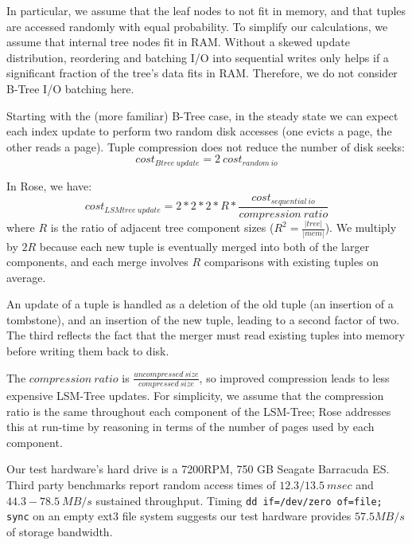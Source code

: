 \documentclass{vldb}
\newcommand{\rows}{Rose\xspace}
\begin{document}
In particular, we assume that the leaf nodes to not fit in memory, and
that tuples are accessed randomly with equal probability.  To simplify
our calculations, we assume that internal tree nodes fit in RAM.
Without a skewed update distribution, reordering and batching I/O into
sequential writes only helps if a significant fraction of the tree's
data fits in RAM.  Therefore, we do not consider B-Tree I/O batching here.

Starting with the (more familiar) B-Tree case, in the steady state we
can expect each index update to perform two random disk accesses (one
evicts a page, the other reads a page).  Tuple compression does not
reduce the number of disk seeks:
\[
   cost_{Btree~update}=2~cost_{random~io}
\]

In \rows, we have:
\[
   cost_{LSMtree~update}=2*2*2*R*\frac{cost_{sequential~io}}{compression~ratio}  %
\]
where $R$ is the ratio of adjacent tree component sizes
($R^2=\frac{|tree|}{|mem|}$).  We multiply by $2R$ because each new
tuple is eventually merged into both of the larger components, and
each merge involves $R$ comparisons with existing tuples on average.

An update of a tuple is handled as a deletion of the old tuple (an
insertion of a tombstone), and an insertion of the new tuple, leading
to a second factor of two.  The third reflects the fact that the
merger must read existing tuples into memory before writing them back
to disk.

The $compression~ratio$ is
$\frac{uncompressed~size}{compressed~size}$, so improved compression
leads to less expensive LSM-Tree updates.  For simplicity, we assume
that the compression ratio is the same throughout each component of
the LSM-Tree; \rows addresses this at run-time by reasoning in terms
of the number of pages used by each component.

Our test hardware's hard drive is a 7200RPM, 750 GB Seagate Barracuda
ES.  
Third party
benchmarks\cite{hdBench} %
report random access times of $12.3/13.5~msec$ and $44.3-78.5~MB/s$
sustained throughput.  Timing {\tt dd if=/dev/zero of=file; sync} on an
empty ext3 file system suggests our test hardware provides $57.5MB/s$ of
storage bandwidth.
\end{document}
